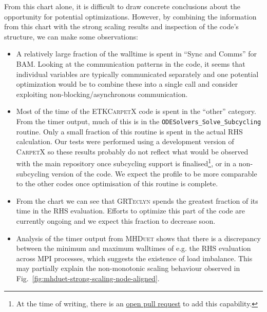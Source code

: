 \documentclass[12pt,a4paper]{article}
\numberwithin{figure}{subsection}
\newcommand{\bam}{\textsc{BAM}\xspace}
\newcommand{\etk}{\textsc{ETK}\xspace} %
\newcommand{\grteclyn}{\textsc{GRTeclyn}\xspace}
\newcommand{\mhduet}{\textsc{MHDuet}\xspace}
\newcommand{\carpetx}{\textsc{CarpetX}\xspace}
\begin{document}
From this chart alone, it is difficult to draw concrete conclusions about the
opportunity for potential optimizations. However, by combining the information
from this chart with the strong scaling results and inspection of the code's
structure, we can make some observations:
\begin{itemize}
    \item A relatively large fraction of the walltime is spent in ``Sync and
    Comms'' for \bam. Looking at the communication patterns in the code, it
    seems that individual variables are typically communicated separately and
    one potential optimization would be to combine these into a single call and
    consider exploiting non-blocking/asynchronous communication.
    \item
    \begin{sloppypar} %
    Most of the time of the \etk \carpetx code is spent in the ``other'' category. 
    From the timer output, much of this is in the
    \texttt{ODESolvers\_Solve\_Subcycling} routine. Only a small fraction of
    this routine is spent in the actual RHS calculation. Our
    tests were performed using a development version of \carpetx so
    these results probably do not reflect what would be observed with the main
    repository once subcycling support is finalised\footnote{At the time of
    writing, there is an
    \href{https://github.com/EinsteinToolkit/CarpetX/pull/371}{open pull
    request} to add this capability.}, or in a non-subcycling version of the code. 
    We expect the profile to be more comparable to the
    other codes once optimisation of this routine is complete.
    \end{sloppypar}
    \item From the chart we can see that \grteclyn spends the greatest fraction
    of its time in the RHS evaluation. Efforts to optimize this part of the code
    are currently ongoing and we expect this fraction to decrease soon.
    \item Analysis of the timer output from \mhduet shows that there is a discrepancy
    between the minimum and maximum walltimes of e.g. the RHS evaluation across
    MPI processes, which suggests the existence of load
    imbalance. This may partially explain the non-monotonic scaling behaviour
    observed in Fig.~\ref{fig:mhduet-strong-scaling-node-aligned}.
\end{itemize}


\end{document}

